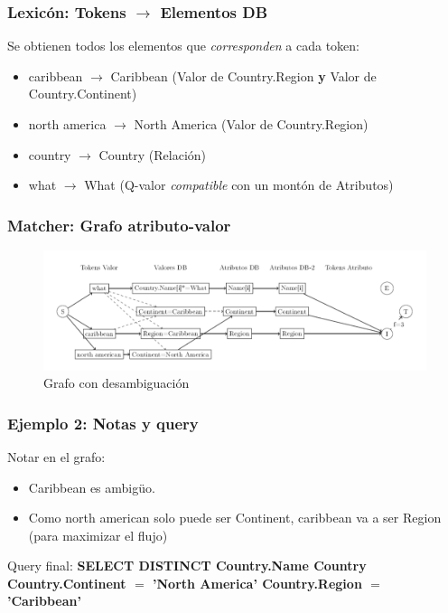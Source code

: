 \begin{frame}[<+->]
\frametitle{Lexicón: Tokens $\rightarrow$ Elementos DB}
Se obtienen todos los elementos que \textit{corresponden} a cada token:
  \begin{itemize}
    \item caribbean $\rightarrow$ Caribbean (Valor de Country.Region \textbf{y} Valor de Country.Continent)
    \item north america $\rightarrow$ North America (Valor de Country.Region)
    \item country $\rightarrow$ Country (Relación)
    \item what $\rightarrow$ What (Q-valor \textit{compatible} con un montón de Atributos)
  \end{itemize}
\end{frame}

\begin{frame}
\frametitle{Matcher: Grafo atributo-valor}
\begin{figure}
  \centering
    \includegraphics[scale=.43]{graficos/presentacion/ejemplo-grafo-2}
    \caption{Grafo con desambiguación}
\end{figure}
\end{frame}

\begin{frame}[<+->]
\frametitle{Ejemplo 2: Notas y query}
Notar en el grafo:
  \begin{itemize}
    \item Caribbean es ambigüo.
    \item Como north american solo puede ser Continent, caribbean va a ser Region (para maximizar el flujo)
  \end{itemize}

Query final:\newline
\Large{\textbf{{\color{purple}SELECT DISTINCT} Country.Name  Country  Country.Continent $=$ {\color{green}'North America'}  Country.Region $=$ {\color{green}'Caribbean'}}}

\end{frame}



